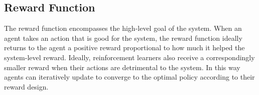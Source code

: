 \documentclass{article}
\begin{document}
%
%
%

\subsection{Reward Function}
The reward function encompasses the high-level goal of the system. When an agent takes an action that is good for the system, the reward function ideally returns to the agent a positive reward proportional to how much it helped the system-level reward. Ideally, reinforcement learners also receive a correspondingly smaller reward when their actions are detrimental to the system. In this way agents can iteratively update to converge to the optimal policy according to their reward design.
\end{document}
